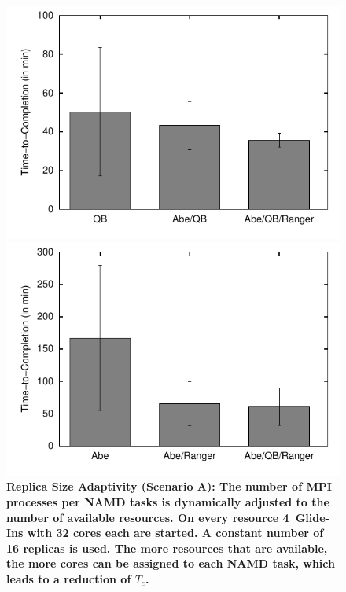 \documentclass{rspublic}
\begin{document}
\begin{figure}[h]
  \begin{minipage}[t]{.48\textwidth}
    \begin{center}  
      \includegraphics[width=\textwidth]{performance/perf_distributed_size_replica.pdf}
      \caption{\footnotesize \bf Replica Size Adaptivity (Scenario A):
        The number of MPI processes per NAMD tasks is dynamically
        adjusted to the number of available resources. On every
        resource 4~Glide-Ins with 32 cores each are started. A
        constant number of 16 replicas is used.  The more resources
        that are available, the more cores can be assigned to each
        NAMD task, which leads to a reduction of $T_{c}$.  }
      \label{fig:performance_perf_distributed_A}
    \end{center}
  \end{minipage}
  \hfill
  \begin{minipage}[t]{.485\textwidth}
    \begin{center}  
      \includegraphics[width=\textwidth]{performance/perf_distributed_number_replica.pdf}

\end{center}
\end{minipage}
\end{figure}
\end{document}
